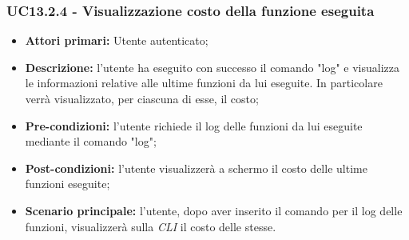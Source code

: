 \subsubsection{UC13.2.4 - Visualizzazione costo della funzione eseguita}
\begin{itemize}
	\item \textbf{Attori primari:} Utente autenticato;
	\item \textbf{Descrizione:} l'utente ha eseguito con successo il comando "log" e visualizza le informazioni relative alle ultime funzioni da lui eseguite. In particolare verrà visualizzato, per ciascuna di esse, il costo; 
	\item \textbf{Pre-condizioni:} l'utente richiede il log delle funzioni da lui eseguite mediante il comando "log"; 
	\item \textbf{Post-condizioni:} l'utente visualizzerà a schermo il costo delle ultime funzioni eseguite;
	\item \textbf{Scenario principale:} l'utente, dopo aver inserito il comando per il log delle funzioni, visualizzerà sulla \textit{CLI\glo} il costo delle stesse.
\end{itemize}
